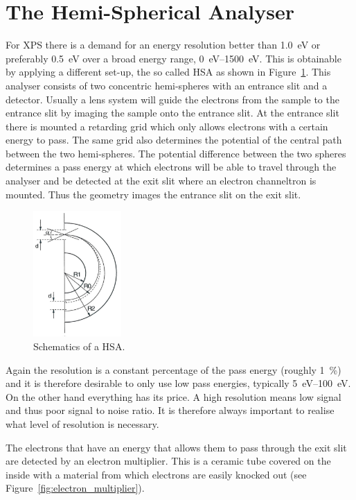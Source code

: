 \section{The Hemi-Spherical Analyser}
For XPS there is a demand for an energy resolution better than \SI{1.0}{\electronvolt} or preferably \SI{0.5}{\electronvolt} over a broad energy range, \SIrange{0}{1500}{\electronvolt}. This is obtainable by applying a different set-up, the so called HSA as shown in Figure~\ref{fig:schematics_hsa}. This analyser consists of two concentric hemi-spheres with an entrance slit and a detector. Usually a lens system will guide the electrons from the sample to the entrance slit by imaging the sample onto the entrance slit. At the entrance slit there is mounted a retarding grid which only allows electrons with a certain energy to pass. The same grid also determines the potential of the central path between the two hemi-spheres. The potential difference between the two spheres determines a pass energy at which electrons will be able to travel through the analyser and be detected at the exit slit where an electron channeltron is mounted. Thus the geometry images the entrance slit on the exit slit.

\begin{figure}[htbp]
\centering
\includegraphics[width=0.3\textwidth]{figures/03_02}
\caption{Schematics of a HSA.}
\label{fig:schematics_hsa}
\end{figure}

Again the resolution is a constant percentage of the pass energy (roughly \SI{1}{\percent}) and it is therefore desirable to only use low pass energies, typically \SIrange{5}{100}{\electronvolt}. On the other hand everything has its price. A high resolution means low signal and thus poor signal to noise ratio. It is therefore always important to realise what level of resolution is necessary.

The electrons that have an energy that allows them to pass through the exit slit are detected by an electron multiplier. This is a ceramic tube covered on the inside with a material from which electrons are easily knocked out (see Figure~\ref{fig:electron_multiplier}).

